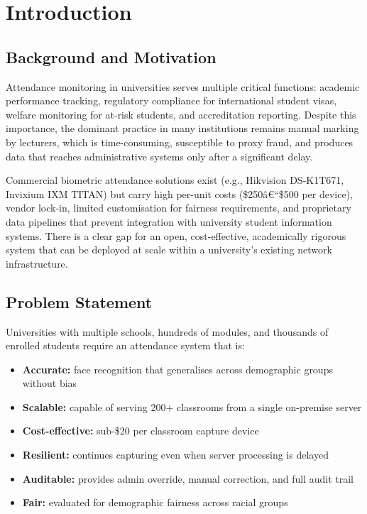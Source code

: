 \documentclass[12pt,a4paper]{report}
\begin{document}
\tableofcontents
\listoffigures
\listoftables

\chapter{Introduction}

\section{Background and Motivation}
Attendance monitoring in universities serves multiple critical functions: academic performance tracking, regulatory compliance for international student visas, welfare monitoring for at-risk students, and accreditation reporting. Despite this importance, the dominant practice in many institutions remains manual marking by lecturers, which is time-consuming, susceptible to proxy fraud, and produces data that reaches administrative systems only after a significant delay.

Commercial biometric attendance solutions exist (e.g., Hikvision DS-K1T671, Invixium IXM TITAN) but carry high per-unit costs (\$250â€“\$500 per device), vendor lock-in, limited customisation for fairness requirements, and proprietary data pipelines that prevent integration with university student information systems. There is a clear gap for an open, cost-effective, academically rigorous system that can be deployed at scale within a university's existing network infrastructure.

\section{Problem Statement}
Universities with multiple schools, hundreds of modules, and thousands of enrolled students require an attendance system that is:
\begin{itemize}
  \item \textbf{Accurate:} face recognition that generalises across demographic groups without bias
  \item \textbf{Scalable:} capable of serving 200+ classrooms from a single on-premise server
  \item \textbf{Cost-effective:} sub-\$20 per classroom capture device
  \item \textbf{Resilient:} continues capturing even when server processing is delayed
  \item \textbf{Auditable:} provides admin override, manual correction, and full audit trail
  \item \textbf{Fair:} evaluated for demographic fairness across racial groups
\end{itemize}
\end{document}
